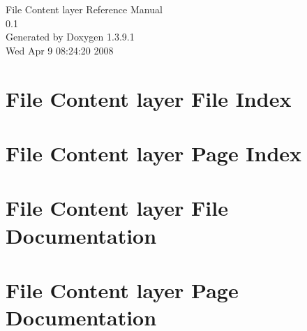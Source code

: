 \documentclass[a4paper]{book}
\begin{document}
\begin{titlepage}
\vspace*{7cm}
\begin{center}
{\Large File Content layer Reference Manual\\[1ex]\large 0.1 }\\
\vspace*{1cm}
{\large Generated by Doxygen 1.3.9.1}\\
\vspace*{0.5cm}
{\small Wed Apr 9 08:24:20 2008}\\
\end{center}
\end{titlepage}
\clearemptydoublepage
{}
\tableofcontents
\clearemptydoublepage
{}
\chapter{File Content layer File Index}

\chapter{File Content layer Page Index}

\chapter{File Content layer File Documentation}












\chapter{File Content layer Page Documentation}

\printindex
\end{document}
